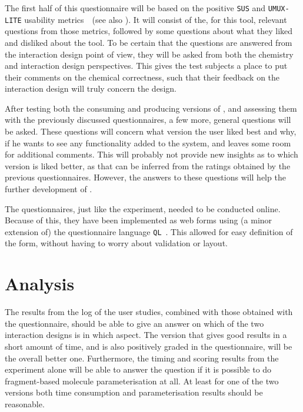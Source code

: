 The first half of this questionnaire will be based on the positive \verb|SUS| and \verb|UMUX-LITE| usability metrics~\cite{lewis2013umux}~(see also ). It will consist of the, for this tool, relevant questions from those metrics, followed by some questions about what they liked and disliked about the tool. To be certain that the questions are answered from the interaction design point of view, they will be asked from both the chemistry and interaction design perspectives. This gives the test subjects a place to put their comments on the chemical correctness, such that their feedback on the interaction design will truly concern the design.

After testing both the consuming and producing versions of \oframp, and assessing them with the previously discussed questionnaires, a few more, general questions will be asked. These questions will concern what version the user liked best and why, if he wants to see any functionality added to the system, and leaves some room for additional comments. This will probably not provide new insights as to which version is liked better, as that can be inferred from the ratings obtained by the previous questionnaires. However, the answers to these questions will help the further development of \oframp.

The questionnaires, just like the experiment, needed to be conducted online. Because of this, they have been implemented as web forms using (a minor extension of) the questionnaire language \verb|QL|~\cite{erdweg2013state}. This allowed for easy definition of the form, without having to worry about validation or layout.



\section{Analysis}
The results from the log of the user studies, combined with those obtained with the questionnaire, should be able to give an answer on which of the two interaction designs is in which aspect. The version that gives good results in a short amount of time, and is also positively graded in the questionnaire, will be the overall better one. Furthermore, the timing and scoring results from the experiment alone will be able to answer the question if it is possible to do fragment-based molecule parameterisation at all. At least for one of the two versions both time consumption and parameterisation results should be reasonable.

